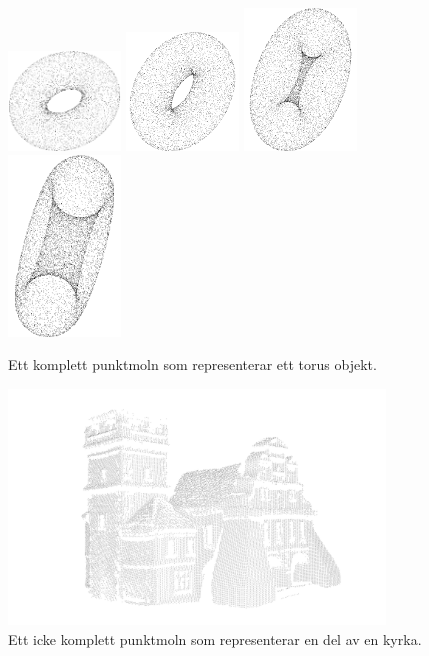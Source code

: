 \begin{figure}[H]
	\centering
	\includegraphics[width=30mm]{figures/Point_cloud_torus1.png}
	\includegraphics[width=30mm]{figures/Point_cloud_torus2.png}
	\includegraphics[width=30mm]{figures/Point_cloud_torus3.png}
	\includegraphics[width=30mm]{figures/Point_cloud_torus4.png}
	\caption{Ett komplett punktmoln som representerar ett torus objekt.}
	\label{fig:point_cloud_torus}
\end{figure}

\begin{figure}[H]
	\centering
	\includegraphics[width=100mm]{figures/icke_komplett_moln_kyrka.png}
	\caption{Ett icke komplett punktmoln som representerar en del av en kyrka.}
	\label{fig:point_cloud_church}
\end{figure}

